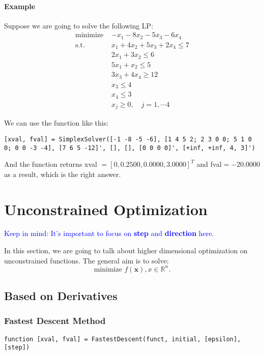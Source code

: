 \documentclass{article}
\begin{document}
\paragraph{Example}
Suppose we are going to solve the following LP:
\begin{align*}
    \mbox{minimize } &  -x_1 - 8x_2 - 5x_3 - 6x_4 \\
    \mbox{s.t. } & x_1 + 4x_2 + 5x_3 + 2x_4 \leqslant 7 \\
                 & 2x_1 + 3x_2 \leqslant 6 \\
                 & 5x_1 + x_2 \leqslant 5 \\
                 & 3x_3 + 4x_4 \geqslant 12 \\
                 & x_3 \leqslant 4 \\
                 & x_4 \leqslant 3 \\
                 & x_j \geqslant 0, \quad j = 1, \cdots 4
\end{align*}

We can use the function like this:
\begin{verbatim}
[xval, fval] = SimplexSolver([-1 -8 -5 -6], [1 4 5 2; 2 3 0 0; 5 1 0 0; 0 0 -3 -4], [7 6 5 -12]', [], [], [0 0 0 0]', [+inf, +inf, 4, 3]')
\end{verbatim}

And the function returns xval $=[0, 0.2500, 0.0000, 3.0000]^T$ and fval$=-20.0000$ as a result, which is the right answer.

\section{Unconstrained Optimization}
\textcolor{blue}{Keep in mind: It's important to focus on \textbf{step} and \textbf{direction} here.}

In this section, we are going to talk about higher dimensional optimization on unconstrained functions. The general aim is to solve:
\begin{equation*}
    \mbox{minimize } f(\mathbf{x}), x \in \mathbb{R}^n.
\end{equation*}

\subsection{Based on Derivatives}
\subsubsection{Fastest Descent Method}
\begin{verbatim}
function [xval, fval] = FastestDescent(funct, initial, [epsilon], [step])
\end{verbatim}
\end{document}
